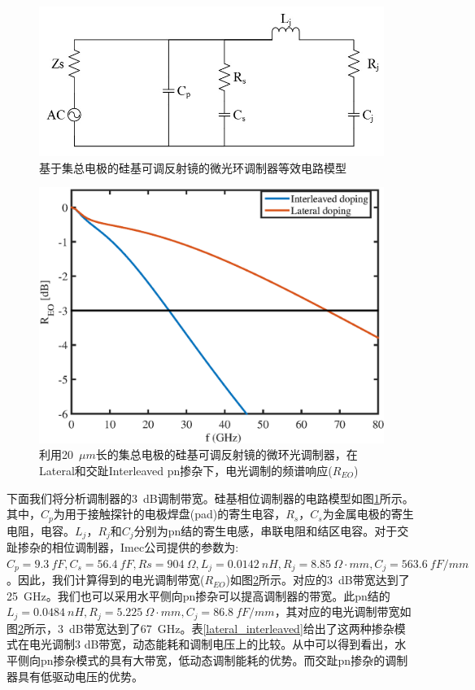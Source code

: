 \begin{figure}[htb]
	\centering
	\includegraphics[width=12cm]{./Pictures/chapt5_tunable_reflection_ring_modulator_equit_circuit.jpg}
	\caption{基于集总电极的硅基可调反射镜的微光环调制器等效电路模型}
	\label{chapt5_tunable_reflection_ring_modulator_equit_circuit}
\end{figure}
\begin{figure}[htb]
	\centering
	\includegraphics[width=12cm]{./Pictures/chapt5_bandwidth.eps}
	\caption{利用20~$\mu m$长的集总电极的硅基可调反射镜的微环光调制器，在Lateral和交趾Interleaved pn掺杂下，电光调制的频谱响应($R_{EO}$)}
	\label{chapt5_bandwidth}
\end{figure}

下面我们将分析调制器的3~dB调制带宽。硅基相位调制器的电路模型如图\ref{chapt5_tunable_reflection_ring_modulator_equit_circuit}所示。其中，$C_p$为用于接触探针的电极焊盘(pad)的寄生电容，$R_s$，$C_s$为金属电极的寄生电阻，电容。$L_j$，$R_j$和$C_j$分别为pn结的寄生电感，串联电阻和结区电容。对于交趾掺杂的相位调制器，Imec公司\cite{Imec}提供的参数为:$C_p = 9.3~fF, C_s = 56.4~fF, Rs = 904~\Omega, L_j = 0.0142~nH, R_j = 8.85~\Omega\cdot mm, C_j = 563.6~fF/mm$。因此，我们计算得到的电光调制带宽($R_{EO}$)如图\ref{chapt5_bandwidth}所示。对应的3~dB带宽达到了25~GHz。我们也可以采用水平侧向pn掺杂可以提高调制器的带宽。此pn结的$L_j = 0.0484~nH, R_j = 5.225~\Omega\cdot mm, C_j = 86.8~fF/mm$，其对应的电光调制带宽如图\ref{chapt5_bandwidth}所示，3~dB带宽达到了67~GHz。表\ref{lateral_interleaved}给出了这两种掺杂模式在电光调制3 dB带宽，动态能耗和调制电压上的比较。从中可以得到看出，水平侧向pn掺杂模式的具有大带宽，低动态调制能耗的优势。而交趾pn掺杂的调制器具有低驱动电压的优势。

